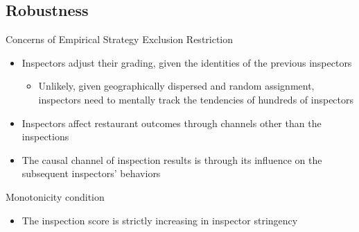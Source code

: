 \documentclass[handout]{beamer}
\begin{document}
\subsection{Robustness}
\begin{frame}{Concerns of Empirical Strategy}
Exclusion Restriction
\begin{itemize}
\item Inspectors adjust their grading, given the identities of the previous inspectors
\begin{itemize}
\item Unlikely, given geographically dispersed and random assignment, inspectors need to mentally track the tendencies of hundreds of inspectors
\end{itemize}
\item Inspectors affect restaurant outcomes through channels other than the inspections
\item The causal channel of inspection results is through its influence on the subsequent inspectors' behaviors
\end{itemize}
\pause
Monotonicity condition
\begin{itemize}
    \item The inspection score is strictly increasing in inspector stringency
\end{itemize}
\end{frame}
\end{document}
